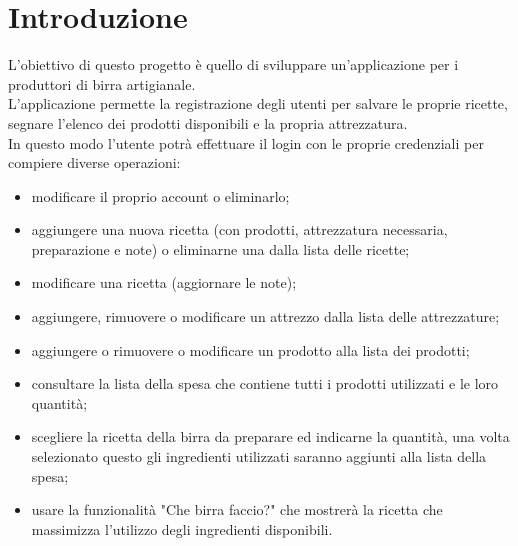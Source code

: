 \documentclass[a4paper, titlepage]{article}
\begin{document}
\section{Introduzione}
L'obiettivo di questo progetto è quello di sviluppare un'applicazione per i produttori di birra artigianale.\\
L'applicazione permette la registrazione degli utenti per salvare le proprie ricette, segnare l'elenco dei prodotti disponibili e la propria attrezzatura.\\
In questo modo l'utente potrà effettuare il login con le proprie credenziali per compiere diverse operazioni:
\begin{itemize}
    \item modificare il proprio account o eliminarlo;
    \item aggiungere una nuova ricetta (con prodotti, attrezzatura necessaria, preparazione e note) o eliminarne una dalla lista delle ricette;
    \item modificare una ricetta (aggiornare le note);
    \item aggiungere, rimuovere o modificare un attrezzo dalla lista delle attrezzature;
    \item aggiungere o rimuovere o modificare un prodotto alla lista dei prodotti;
    \item consultare la lista della spesa che contiene tutti i prodotti utilizzati e le loro quantità;
    \item scegliere la ricetta della birra da preparare ed indicarne la quantità, una volta selezionato questo gli ingredienti utilizzati saranno aggiunti alla lista della spesa;
    \item usare la funzionalità "Che birra faccio?" che mostrerà la ricetta che massimizza l'utilizzo degli ingredienti disponibili.
\end{itemize}

\newpage
\end{document}
